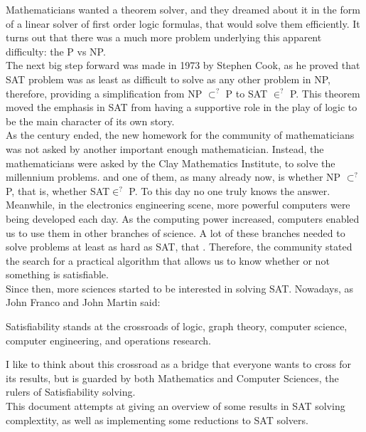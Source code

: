 Mathematicians wanted a theorem solver, and they dreamed about it in the form of a linear solver of first order logic formulas, that would solve them efficiently. It turns out that there was a much more problem underlying this apparent difficulty: the P vs NP.\\

The next big step forward was made in 1973 by Stephen Cook, as he proved that SAT problem was as least as difficult to solve as any other problem in NP, therefore, providing a simplification from NP $\subset^?$ P to  SAT $\in^? $ P. This theorem moved the emphasis in SAT from having a supportive role in the play of logic to be the main character of its own story.\\

As the century ended, the new homework for the community of mathematicians was not asked by another important enough mathematician. Instead, the mathematicians  were asked by the Clay Mathematics Institute, to solve the millennium problems. and one of them, as many already now, is whether NP $\subset^?$ P, that is, whether SAT$\in^?$ P. To this day no one truly knows the answer. \\

Meanwhile, in the electronics engineering scene, more powerful computers were being developed each day. As the computing power increased, computers enabled us to use them in other branches of science. A lot of these branches needed to solve problems at least as hard as SAT, that . Therefore, the community stated the search for a practical algorithm that  allows us to know whether or not something is satisfiable.\\


Since then, more sciences started to be interested in solving SAT. Nowadays, as John Franco and John Martin said:
\begin{quoting}
Satisfiability stands at the crossroads of logic, graph theory, computer science, computer engineering, and operations research.
\end{quoting}

I like to think about this crossroad as a bridge that everyone wants to cross for its results, but is guarded by both Mathematics and Computer Sciences, the rulers of Satisfiability solving.\\

This document attempts at giving an overview of some results in SAT solving complextity, as well as implementing some reductions to SAT solvers. \\

